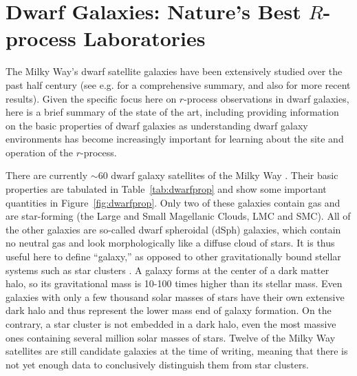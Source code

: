 \documentclass[letterpaper]{article}
\begin{document}
\section{Dwarf Galaxies: Nature's Best $R$-process Laboratories}\label{sec:dwarfgals}

The Milky Way's dwarf satellite galaxies have been extensively studied over the past half century (see e.g. \citealt{Tolstoy2009} for a comprehensive summary, and also \citealt{Simon2019} for more recent results). Given the specific focus here on $r$-process observations in dwarf galaxies, here is a brief summary of the state of the art, including providing information on the basic properties of dwarf galaxies as understanding dwarf galaxy environments has become increasingly important for learning about the site and operation of the $r$-process.

There are currently ${\sim60}$ dwarf galaxy satellites of the Milky Way \citep{Simon2019}.
Their basic properties are tabulated in Table~\ref{tab:dwarfprop} and show some important quantities in Figure~\ref{fig:dwarfprop}.
Only two of these galaxies contain gas and are star-forming (the Large and Small Magellanic Clouds, LMC and SMC). All of the other galaxies are so-called dwarf spheroidal (dSph) galaxies, which contain no neutral gas and look morphologically like a diffuse cloud of stars.
It is thus useful here to define ``galaxy,'' as opposed to other gravitationally bound stellar systems such as star clusters \citep{Willman2012}. A galaxy forms at the center of a dark matter halo, so its gravitational mass is 10-100 times higher than its stellar mass. Even galaxies with only a few thousand solar masses of stars have their own extensive dark halo and thus represent the lower mass end of galaxy formation. On the contrary, a star cluster is not embedded in a dark halo, even the most massive ones containing several million solar masses of stars.
Twelve of the Milky Way satellites are still candidate galaxies at the time of writing, meaning that there is not yet enough data to conclusively distinguish them from star clusters.
\end{document}
